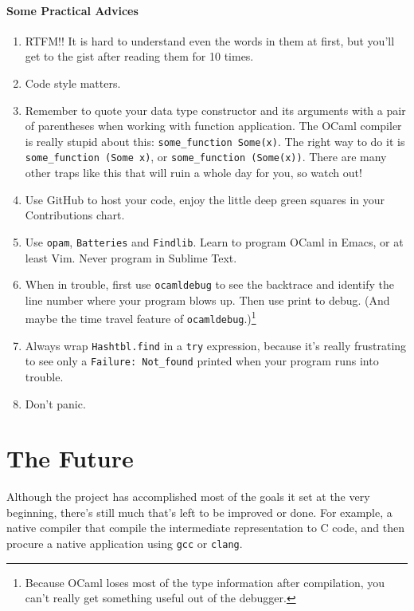 \documentclass{report}
\begin{document}
\subsection{Some Practical Advices}
\begin{enumerate}
\item RTFM!! It is hard to understand even the words in them at first, but you'll get to the gist after reading them for 10 times.

\item Code style matters.

\item Remember to quote your data type constructor and its arguments with a pair of parentheses when working with function application. The OCaml compiler is really stupid about this: \texttt{some\_function Some(x)}. The right way to do it is \texttt{some\_function (Some x)}, or \texttt{some\_function (Some(x))}. There are many other traps like this that will ruin a whole day for you, so watch out!

\item Use GitHub to host your code, enjoy the little deep green squares in your Contributions chart.

\item Use \texttt{opam}, \texttt{Batteries} and \texttt{Findlib}. Learn to program OCaml in Emacs, or at least Vim. Never program in Sublime Text.

\item When in trouble, first use \texttt{ocamldebug} to see the backtrace and identify the line number where your program blows up. Then use print to debug. (And maybe the time travel feature of \texttt{ocamldebug}.)\footnote{Because OCaml loses most of the type information after compilation, you can't really get something useful out of the debugger.}

\item Always wrap \texttt{Hashtbl.find} in a \texttt{try} expression, because it's really frustrating to see only a \texttt{Failure: Not\_found} printed when your program runs into trouble.

\item Don't panic.
\end{enumerate}

\part{The Future}

Although the project has accomplished most of the goals it set at the very beginning, there's still much that's left to be improved or done. For example, a native compiler that compile the intermediate representation to C code, and then procure a native application using \texttt{gcc} or \texttt{clang}.
\end{document}
